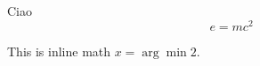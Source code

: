 \begin{frame}{Ciao}
  \begin{equation}
    e = mc^2
  \end{equation}

  This is inline math $x = \arg\min 2$.
\end{frame}
